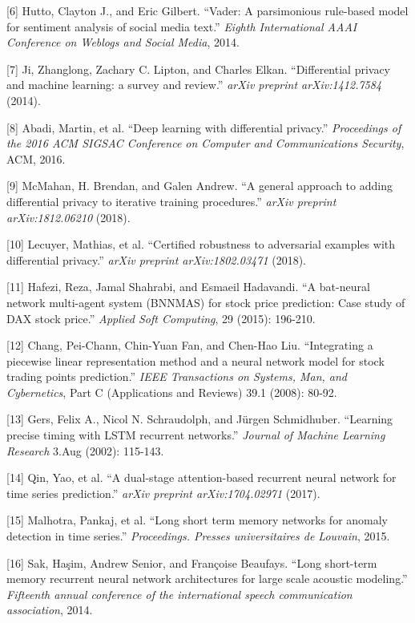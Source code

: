 \documentclass{article}
\begin{document}
[6] Hutto, Clayton J., and Eric Gilbert. ``Vader: A parsimonious rule-based model for sentiment analysis of social media text.'' {\em Eighth International AAAI Conference on Weblogs and Social Media}, 2014.


[7] Ji, Zhanglong, Zachary C. Lipton, and Charles Elkan. ``Differential privacy and machine learning: a survey and review.'' {\em arXiv preprint arXiv:1412.7584} (2014).


[8] Abadi, Martin, et al. ``Deep learning with differential privacy.'' {\em Proceedings of the 2016 ACM SIGSAC Conference on Computer and Communications Security}, ACM, 2016.


[9] McMahan, H. Brendan, and Galen Andrew. ``A general approach to adding differential privacy to iterative training procedures.'' {\em arXiv preprint arXiv:1812.06210} (2018).


[10] Lecuyer, Mathias, et al. ``Certified robustness to adversarial examples with differential privacy.'' {\em arXiv preprint arXiv:1802.03471} (2018).


[11] Hafezi, Reza, Jamal Shahrabi, and Esmaeil Hadavandi. ``A bat-neural network multi-agent system (BNNMAS) for stock price prediction: Case study of DAX stock price.'' {\em Applied Soft Computing}, 29 (2015): 196-210.


[12] Chang, Pei-Chann, Chin-Yuan Fan, and Chen-Hao Liu. ``Integrating a piecewise linear representation method and a neural network model for stock trading points prediction.'' {\em IEEE Transactions on Systems, Man, and Cybernetics}, Part C (Applications and Reviews) 39.1 (2008): 80-92.


[13] Gers, Felix A., Nicol N. Schraudolph, and Jürgen Schmidhuber. ``Learning precise timing with LSTM recurrent networks.'' {\em Journal of Machine Learning Research} 3.Aug (2002): 115-143.

[14] Qin, Yao, et al. ``A dual-stage attention-based recurrent neural network for time series prediction.'' {\em arXiv preprint arXiv:1704.02971} (2017).

[15] Malhotra, Pankaj, et al. ``Long short term memory networks for anomaly detection in time series.'' {\em Proceedings. Presses universitaires de Louvain}, 2015.

[16] Sak, Haşim, Andrew Senior, and Françoise Beaufays. ``Long short-term memory recurrent neural network architectures for large scale acoustic modeling.'' {\em Fifteenth annual conference of the international speech communication association}, 2014.
\end{document}
